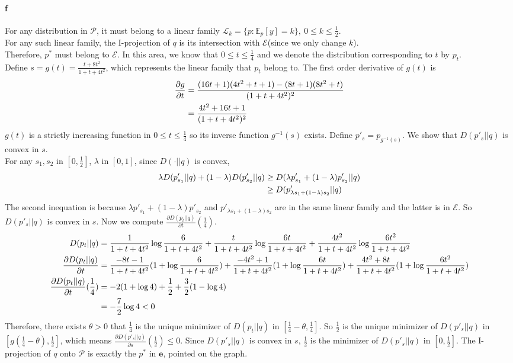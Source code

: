 \documentclass{article}
\begin{document}
\paragraph{f}
For any distribution in $\mathcal{P}$, it must belong to a linear family $\mathcal{L}_k=\{p:\mathbb{E}_p[y]=k\},\ 0\le k\le \frac{1}{2}$. \\
For any such linear family, the I-projection of $q$ is its intersection with $\mathcal{E}$(since we only change $k$).\\
Therefore, $p^*$ must belong to $\mathcal{E}$. In this area, we know that $0\le t \le \frac{1}{4}$ and we denote the distribution corresponding to $t$ by $p_t$. \\
Define $s=g(t)=\frac{t+8t^2}{1+t+4t^2}$, which represents the linear family that $p_t$ belong to. The first order derivative of $g(t)$ is
\begin{align}
	\frac{\partial g}{\partial t}&=\frac{(16t+1)(4t^2+t+1)-(8t+1)(8t^2+t)}{(1+t+4t^2)^2}\notag\\
	&=\frac{4t^2+16t+1}{(1+t+4t^2)^2}\notag
\end{align}
$g(t)$ is a strictly increasing function in $0\le t \le \frac{1}{4}$ so its inverse function $g^{-1}(s)$ exists. Define $p'_s=p_{g^{-1}(s)}$. We show that $D(p'_s||q)$ is convex in $s$.\\
For any $s_1,s_2$ in $[0,\frac{1}{2}]$, $\lambda$ in $[0,1]$, since $D(\cdot||q)$ is convex, 
\begin{align}
	\lambda D(p'_{s_1}||q)+(1-\lambda)D(p'_{s_2}||q)&\ge D(\lambda p'_{s_1}+(1-\lambda)p'_{s_2}||q)\notag\\
	&\ge D(p'_{\lambda s_1+(1-\lambda)s_2}||q)\notag
\end{align}
The second inequation is because $\lambda p'_{s_1}+(1-\lambda)p'_{s_2}$ and $p'_{\lambda s_1+(1-\lambda)s_2}$ are in the same linear family and the latter is in $\mathcal{E}$. So $D(p'_s||q)$ is convex in $s$. Now we compute $\frac{\partial D(p_t||q)}{\partial t}(\frac{1}{4})$.
\begin{align}
	D(p_t||q)&=\frac{1}{1+t+4t^2}\log \frac{6}{1+t+4t^2}+\frac{t}{1+t+4t^2}\log \frac{6t}{1+t+4t^2}+\frac{4t^2}{1+t+4t^2}\log \frac{6t^2}{1+t+4t^2}\notag\\
	\frac{\partial D(p_t||q)}{\partial t}&=\frac{-8t-1}{1+t+4t^2}(1+\log \frac{6}{1+t+4t^2})+\frac{-4t^2+1}{1+t+4t^2}(1+\log \frac{6t}{1+t+4t^2})+\frac{4t^2+8t}{1+t+4t^2}(1+\log \frac{6t^2}{1+t+4t^2})\notag\\
	\frac{\partial D(p_t||q)}{\partial t}(\frac{1}{4})&=-2(1+\log 4)+\frac{1}{2}+\frac{3}{2}(1-\log 4)\notag \\
	&=-\frac{7}{2}\log 4<0\notag
\end{align} 
Therefore, there exists $\theta>0$ that $\frac{1}{4}$ is the unique minimizer of $D(p_t||q)$ in $[\frac{1}{4}-\theta,\frac{1}{4}]$. So $\frac{1}{2}$ is the unique minimizer of $D(p'_s||q)$ in $[g(\frac{1}{4}-\theta),\frac{1}{2}]$, which means $\frac{\partial D(p'_s||q)}{\partial s}(\frac{1}{2})\le 0$. Since $D(p'_s||q)$ is convex in $s$, $\frac{1}{2}$ is the minimizer of $D(p'_s||q)$ in $[0,\frac{1}{2}]$. The I-projection of $q$ onto $\mathcal{P}$ is exactly the $p^*$ in $\mathbf{e}$, pointed on the graph.
\end{document}
